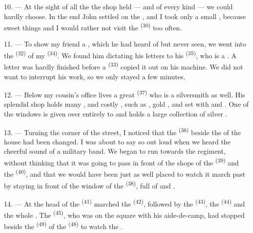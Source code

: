 10. --- At the sight of all the  the shop held ---
 and  of every kind --- we
could hardly choose. In the end John settled on the , and I took only a
small , because sweet things
 and I would rather not visit the
 \textsuperscript{(30)} too often.

\VUsaut{3.0mm}

11. --- To show my friend a , which he had heard of but never seen, we went
into the  \textsuperscript{(32)} of my
 \textsuperscript{(34)}. We found him dictating his letters to his 
\textsuperscript{(35)}, who is a . A letter was hardly finished
before a  \textsuperscript{(33)} copied it out on his machine. We did not want
to interrupt his work, so we only stayed a few minutes.

12. --- Below my cousin's office lives a great
 \textsuperscript{(37)} who is a silversmith as well.
His splendid shop holds many ,
 and costly , such as ,
gold ,  and  set with
 and . One of the windows is given
over entirely to  and holds a large collection of silver
.

13. --- Turning the corner of the street, I noticed that the
 \textsuperscript{(36)} beside the  of the house had been
changed. I was about to say so out loud when we heard the cheerful sound of a military band.
We began to run towards the regiment, without thinking that it was going to pass in front of
the shops of the  \textsuperscript{(39)} and the 
\textsuperscript{(40)}, and that we would have been just as well placed to watch it march past
by staying in front of the window of the  \textsuperscript{(38)}, full of
 and .

\VUsaut{3.0mm}

14. --- At the head of the  \textsuperscript{(41)} marched the
 \textsuperscript{(42)}, followed by the 
\textsuperscript{(43)}, the  \textsuperscript{(44)} and the whole
. The
 \textsuperscript{(45)}, who was on the square with his aide-de-camp, had
stopped beside the  \textsuperscript{(49)} of the
 \textsuperscript{(48)} to watch the .

